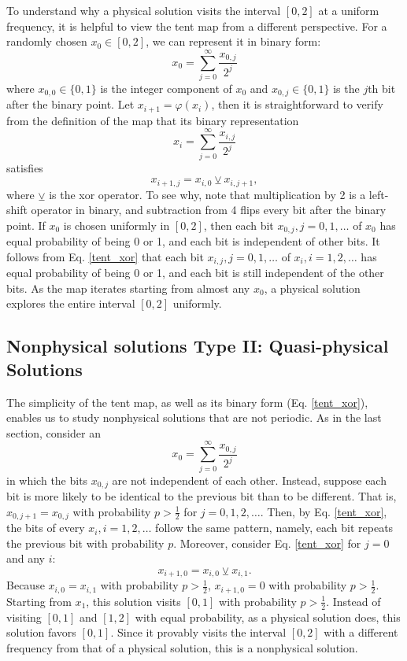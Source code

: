 \documentclass[preprint,12pt]{elsarticle}
\begin{document}
To understand why a physical solution visits the interval $[0,2]$ at a uniform
frequency, it is helpful to view the tent map from a different perspective.
For a randomly chosen $x_0\in[0,2]$, we can represent it in binary form:
\begin{equation}
    x_0 = \sum_{j=0}^{\infty} \frac{x_{0,j}}{2^j}
\end{equation}
where $x_{0,0}\in\{0,1\}$ is the integer component of $x_0$ and $x_{0,j}\in\{0,1\}$ is the $j$th bit after the binary point.
Let $x_{i+1} = \varphi(x_i)$, then it is straightforward to verify from the definition
of the map that its binary representation
\begin{equation}
    x_i = \sum_{j=0}^{\infty} \frac{x_{i,j}}{2^j}
\end{equation}
satisfies
\begin{equation} \label{tent_xor}
    x_{i+1,j} = x_{i,0} \veebar x_{i,j+1},
\end{equation}
where $\veebar$ is the xor operator. To see why, note that 
multiplication by 2 is a left-shift operator in binary, and 
subtraction from 4 flips every bit after the binary point. If $x_0$ is chosen uniformly in $[0,2]$, then each bit $x_{0,j},j=0,1,\ldots$ of $x_0$
has equal probability of being 0 or 1, and each bit is independent of other bits.
It follows from Eq. \ref{tent_xor} that each bit $x_{i,j},j=0,1,\ldots$ of $x_i,
i=1,2,\ldots$ has equal probability of being 0 or 1,
and each bit is still independent of the other bits.
As the map iterates starting from almost any $x_0$, a physical solution explores the entire interval $[0,2]$ uniformly.

\subsection{Nonphysical solutions Type II: Quasi-physical Solutions}
\label{sec:quasiphysical}
The simplicity of the tent map, as well as its binary form (Eq. \ref{tent_xor}),
enables us to study nonphysical solutions that are not periodic.
As in the last section, consider an
\begin{equation}
    x_0 = \sum_{j=0}^{\infty} \frac{x_{0,j}}{2^j}
\end{equation}
in which the bits $x_{0,j}$ are not independent of each other.  Instead,
suppose each bit is more likely to be identical to the previous bit than to be different.
That is, $x_{0,j+1}=x_{0,j}$ with probability $p>\frac12$ for $j=0,1,2,\ldots$.
Then, by Eq. \ref{tent_xor}, the bits of every $x_i, i=1,2,\ldots$ follow the same pattern, namely, each bit repeats the previous bit
with probability $p$. Moreover, consider Eq. \ref{tent_xor} 
for $j=0$ and any $i$:
\begin{equation}
    x_{i+1,0} = x_{i,0} \veebar x_{i,1}.
\end{equation}
Because $x_{i,0}=x_{i,1}$ with probability $p>\frac12$, $x_{i+1,0}=0$ with probability 
$p>\frac12$.  Starting from $x_1$, this solution visits $[0,1]$ with
probability $p>\frac12$.  Instead of visiting $[0,1]$ and $[1,2]$ with
equal probability, as a physical solution does, this solution favors $[0,1]$. Since it provably visits the interval $[0,2]$ with a different frequency from that
of a physical solution, this is a nonphysical solution.
\end{document}
